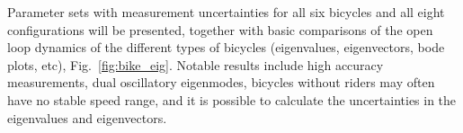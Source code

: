 \documentclass{bmd2010a}
\begin{document}
Parameter sets with measurement uncertainties for all six bicycles and all
eight configurations  will be presented, together with basic comparisons of the
open loop dynamics of the different types of bicycles (eigenvalues,
eigenvectors, bode plots, etc), Fig.~\ref{fig:bike_eig}. Notable results include high accuracy
measurements, dual oscillatory eigenmodes, bicycles without riders may often
have no stable speed range, and it is possible to calculate the uncertainties
in the eigenvalues and eigenvectors.



\end{document}
